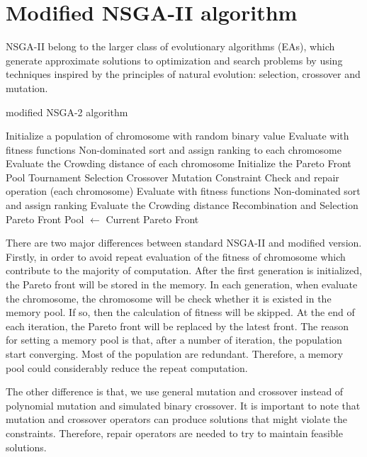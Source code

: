 \documentclass{llncs}
\begin{document}
\section{Modified NSGA-II algorithm}
NSGA-II belong to the larger class of evolutionary algorithms (EAs), which generate approximate solutions to 
optimization and search problems by using techniques inspired by the principles of natural 
evolution: selection, crossover and mutation.

\begin{algorithm}
	\caption{modified NSGA-2 algorithm}
	\label{NSGA2}
	\begin{algorithmic}[1]
		\State Initialize a population of chromosome with random binary value
		\State Evaluate with fitness functions
		\State Non-dominated sort and assign ranking to each chromosome
		\State Evaluate the Crowding distance of each chromosome
		\State Initialize the Pareto Front Pool
		\State Tournament Selection
		\State Crossover 
		\State Mutation
		\State Constraint Check and repair operation
		\For(each chromosome)
		\State Evaluate with fitness functions
		\EndIf
		\State Non-dominated sort and assign ranking
		\State Evaluate the Crowding distance
		\EndFor
		\State Recombination and Selection
		\State Pareto Front Pool $\leftarrow$ Current Pareto Front
		\EndWhile
	\end{algorithmic}
\end{algorithm}

There are two major differences between standard NSGA-II and modified version. Firstly, in order to avoid repeat evaluation of the fitness
of chromosome which contribute to the majority of computation. After the first generation is initialized, the Pareto front will be 
stored in the memory. In each generation, when evaluate the chromosome, the chromosome will be check whether it is existed in the memory pool. 
If so, then the calculation of fitness will be skipped. At the end of each iteration, the Pareto front will be replaced by the latest front.
The reason for setting a memory pool is that, after a number of iteration, the population start converging. 
Most of the population are redundant. Therefore, a memory pool could considerably reduce the repeat computation.

The other difference is that, we use general mutation and crossover instead of polynomial mutation and simulated binary crossover.
It is important to note that mutation and crossover operators can produce solutions that might violate the constraints. 
Therefore, repair operators are needed to try to maintain feasible solutions.
\end{document}
